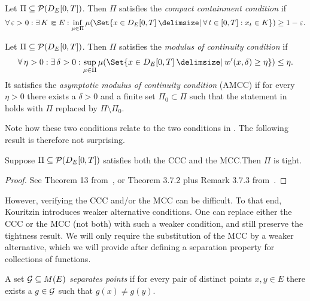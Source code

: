 \begin{definition}[CCC]
  Let \( \Pi \subseteq \mathcal{P}(D_{E}[0,T]) \).
  Then \( \Pi \) satisfies the \textit{compact containment condition} if
  \begin{equation}
    \forall \eps > 0 : \exists K \Subset E : \inf_{\mu \in \Pi} \mu(\Set{x \in D_E[0,T] \given \forall t \in [0,T] : x_t \in K}) \geq 1 - \eps.
  \end{equation}
\end{definition}

\begin{definition}[MCC]
  Let \( \Pi \subseteq \mathcal{P}(D_{E}[0,T]) \).
  Then \( \Pi \) satisfies the \textit{modulus of continuity condition} if
  \begin{equation}\label{eq:MCC}
    \forall \eta > 0 : \exists \delta > 0 : \sup_{\mu \in \Pi} \mu(\Set{x \in D_E[0,T] \given w'(x,\delta) \geq \eta}) \leq \eta.
  \end{equation}
  It satisfies the \textit{asymptotic modulus of continuity condition} (AMCC) if for every \( \eta > 0 \) there exists a \( \delta > 0 \) and a finite set \( \Pi_0 \subset \Pi \) such that the statement in  holds with \( \Pi \) replaced by \( \Pi \setminus \Pi_0 \).
\end{definition}

Note how these two conditions relate to the two conditions in .
The following result is therefore not surprising.

\begin{theorem}
  Suppose \( \Pi \subseteq \mathcal{P}(D_{E}[0,T]) \) satisfies both the CCC and the MCC.\@ Then \( \Pi \) is tight.
\end{theorem}

\begin{proof}
  See Theorem 13 from~\cite{kouritzinTightnessProbabilityMeasures2015}, or Theorem 3.7.2 plus Remark 3.7.3 from~\cite{ethierMarkovProcessesCharacterization1985}.
\end{proof}

However, verifying the CCC and/or the MCC can be difficult.
To that end, Kouritzin introduces weaker alternative conditions.
One can replace either the CCC or the MCC (not both) with such a weaker condition, and still preserve the tightness result.
We will only require the substitution of the MCC by a weaker alternative, which we will provide after defining a separation property for collections of functions.

\begin{definition}
  A set \( \mathcal{G} \subseteq M(E) \) \textit{separates points} if for every pair of distinct points \( x, y \in E \) there exists a \( g \in \mathcal{G} \) such that \( g(x) \neq g(y) \).
\end{definition}

